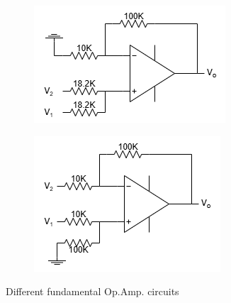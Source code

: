 \begin{figure}[h]
    \vspace{0.2 cm}
        \begin{subfigure}[h]{0.47\textwidth}
        \begin{center}
            \includegraphics[width=1\linewidth]{Lab10/Lab10e.drawio.png}
            \caption{}
            \label{L10e}
        \end{center}
        \end{subfigure}
    \hfill
        \begin{subfigure}[h]{0.47\textwidth}
        \begin{center}
            \includegraphics[width=1\linewidth]{Lab10/Lab10f.drawio.png}
            \caption{}
            \label{L10f}
        \end{center}
        \end{subfigure}
    \caption{Different fundamental Op.Amp. circuits}
    \label{l10figs}
    
    \end{figure}
    \FloatBarrier

